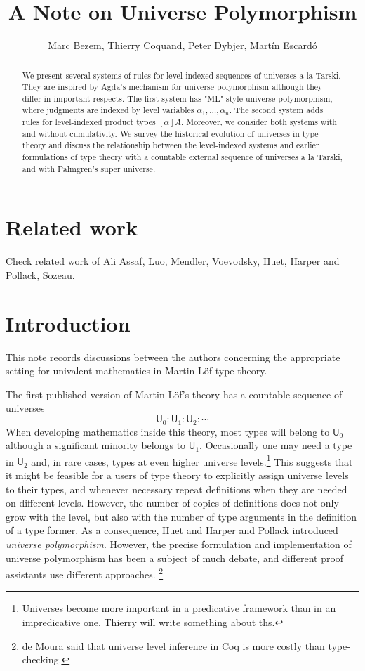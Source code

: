 \documentclass[11pt,a4paper]{article}
\def\UU{\mathsf{U}}
\newcommand{\U}{\mathsf{U}}
\begin{document}
\title{A Note on Universe Polymorphism}

\author{Marc Bezem, Thierry Coquand, Peter Dybjer, Mart\'in Escard\'o}
\date{}
\maketitle

\begin{abstract}
We present several systems of rules for level-indexed sequences of universes a la Tarski. They are inspired by Agda's mechanism for universe polymorphism although they differ in important respects. The first system has "ML"-style universe polymorphism, where judgments are indexed by level variables $\alpha_1, \ldots, \alpha_n$. The second system adds rules for level-indexed product types $[\alpha]A$. Moreover, we consider both systems with and without cumulativity. We survey the historical evolution of universes in type theory and discuss the relationship between the level-indexed systems and earlier formulations of type theory with a countable external sequence of universes a la Tarski, and with Palmgren's super universe. 
\end{abstract}

\section*{Related work}

Check related work of Ali Assaf, Luo, Mendler, Voevodsky, Huet, Harper and Pollack, Sozeau.

\section{Introduction}

This note records discussions between the authors concerning the appropriate setting for univalent mathematics in Martin-Löf type theory. 

The first published version of Martin-Löf's theory \cite{martinlof:predicative} has a countable sequence of universes
$$
\UU_0 : \UU_1 : \UU_2 : \cdots
$$
When developing mathematics inside this theory, most types will belong to $\U_0$ although a significant minority belongs to $\U_1$. Occasionally one may need a type in $\U_2$ and, in rare cases, types at even higher universe levels.\footnote{Universes become more important in a predicative framework than in an impredicative one. Thierry will write something about ths.} This suggests that it might be feasible for a users of type theory to explicitly assign universe levels to their types, and whenever necessary repeat definitions when they are needed on different levels. However, the number of copies of definitions does not only grow with the level, but also with the number of type arguments in the definition of a type former. As a consequence, Huet \cite{huet} and Harper and Pollack \cite{harperpollack} introduced {\em universe polymorphism}. However, the precise formulation and implementation of universe polymorphism has been a subject of much debate, and different proof assistants use different approaches. \footnote{de Moura said that universe level inference in Coq is more costly than type-checking.}
\end{document}
